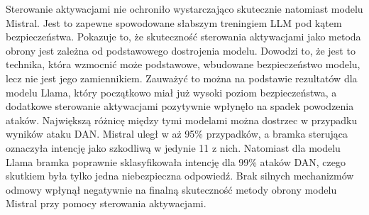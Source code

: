 Sterowanie aktywacjami nie ochroniło wystarczająco skutecznie natomiast modelu Mistral. Jest to zapewne spowodowane słabszym treningiem \gls{LLM} pod kątem bezpieczeństwa. Pokazuje to, że skuteczność sterowania aktywacjami jako metoda obrony jest zależna od podstawowego dostrojenia modelu. Dowodzi to, że jest to technika, która wzmocnić może podstawowe, wbudowane bezpieczeństwo modelu, lecz nie jest jego zamiennikiem. Zauważyć to można na podstawie rezultatów dla modelu Llama, który początkowo miał już wysoki poziom bezpieczeństwa, a dodatkowe sterowanie aktywacjami pozytywnie wpłynęło na spadek powodzenia ataków. Największą różnicę między tymi modelami można dostrzec w przypadku wyników ataku \gls{DAN}. Mistral uległ w aż 95\% przypadków, a bramka sterująca oznaczyła intencję jako szkodliwą w jedynie 11 z nich. Natomiast dla modelu Llama bramka poprawnie sklasyfikowała intencję dla 99\% ataków \gls{DAN}, czego skutkiem była tylko jedna niebezpieczna odpowiedź. Brak silnych mechanizmów odmowy wpłynął negatywnie na finalną skuteczność metody obrony modelu Mistral przy pomocy sterowania aktywacjami.

